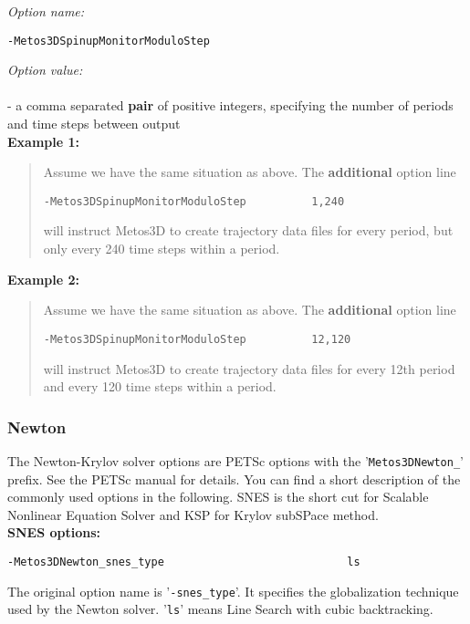 \documentclass{article}
\begin{document}
\emph{Option name:}
\begin{verbatim}
-Metos3DSpinupMonitorModuloStep
\end{verbatim}

\emph{Option value:} \\
\vspace{-0.3cm}\\
- a comma separated \textbf{pair} of positive integers, specifying 
the number of periods and time steps between output \\

\textbf{Example 1:}
\begin{quote}
Assume we have the same situation as above. The \textbf{additional} option line
\begin{verbatim}
-Metos3DSpinupMonitorModuloStep          1,240
\end{verbatim}
will instruct Metos3D to create trajectory data files for every
period, but only every 240 time steps within a period.
\end{quote}

\textbf{Example 2:}
\begin{quote}
Assume we have the same situation as above. The \textbf{additional} option line
\begin{verbatim}
-Metos3DSpinupMonitorModuloStep          12,120
\end{verbatim}
will instruct Metos3D to create trajectory data files for every 12th
period and every 120 time steps within a period.
\end{quote}

\subsubsection{Newton}

The Newton-Krylov solver options are PETSc options with the
'\texttt{Metos3DNewton\_}' prefix. See the PETSc manual for details.
You can find a short description of the commonly used options
in the following. SNES is the short cut for Scalable Nonlinear
Equation Solver and KSP for Krylov subSPace method. \\

\textbf{SNES options:}

\begin{verbatim}
-Metos3DNewton_snes_type                            ls
\end{verbatim}
The original option name is '\texttt{-snes\_type}'. It specifies the
globalization technique used by the Newton solver. '\texttt{ls}'
means Line Search with cubic backtracking.
\end{document}

